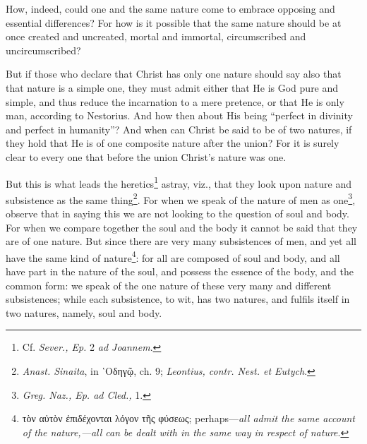 How, indeed, could one and the same nature come to embrace opposing and essential differences? For how is it possible that the same nature should be at once created and uncreated, mortal and immortal, circumscribed and uncircumscribed?

But if those who declare that Christ has only one nature should say also that that nature is a simple one, they must admit either that He is God pure and simple, and thus reduce the incarnation to a mere pretence, or that He is only man, according to Nestorius. And how then about His being “perfect in divinity and perfect in humanity”? And when can Christ be said to be of two natures, if they hold that He is of one composite nature after the union? For it is surely clear to every one that before the union Christ’s nature was one.

But this is what leads the heretics\footnote{Cf. \emph{Sever., Ep. }2 \emph{ad Joannem}.} astray, viz., that they look upon nature and subsistence as the same thing\footnote{\emph{Anast. Sinaita}, in \textgreek{῾Οδηγῷ}, ch. 9; \emph{Leontius, contr. Nest. et Eutych}.}. For when we speak of the nature of men as one\footnote{\emph{Greg. Naz., Ep. ad Cled., }1.}, observe that in saying this we are not looking to the question of soul and body. For when we compare together the soul and the body it cannot be said that they are of one nature. But since there are very many subsistences of men, and yet all have the same kind of nature\footnote{\textgreek{τὸν αὐτὸν ἐπιδέχονται λόγον τῆς φύσεως}; perhaps—\emph{all admit the same account of the nature,—all can be dealt with in the same way in respect of nature}.}: for all are composed of soul and body, and all have part in the nature of the soul, and possess the essence of the body, and the common form: we speak of the one nature of these very many and different subsistences; while each subsistence, to wit, has two natures, and fulfils itself in two natures, namely, soul and body.

